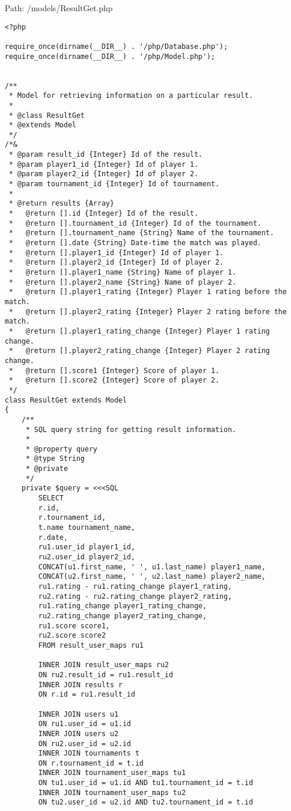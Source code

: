Path: /models/ResultGet.php
{\scriptsize
\begin{lstlisting}
<?php

require_once(dirname(__DIR__) . '/php/Database.php');
require_once(dirname(__DIR__) . '/php/Model.php');


/**
 * Model for retrieving information on a particular result.
 *
 * @class ResultGet
 * @extends Model
 */
/*&
 * @param result_id {Integer} Id of the result.
 * @param player1_id {Integer} Id of player 1.
 * @param player2_id {Integer} Id of player 2.
 * @param tournament_id {Integer} Id of tournament.
 *
 * @return results {Array}
 *   @return [].id {Integer} Id of the result.
 *   @return [].tournament_id {Integer} Id of the tournament.
 *   @return [].tournament_name {String} Name of the tournament.
 *   @return [].date {String} Date-time the match was played.
 *   @return [].player1_id {Integer} Id of player 1.
 *   @return [].player2_id {Integer} Id of player 2.
 *   @return [].player1_name {String} Name of player 1.
 *   @return [].player2_name {String} Name of player 2.
 *   @return [].player1_rating {Integer} Player 1 rating before the match.
 *   @return [].player2_rating {Integer} Player 2 rating before the match.
 *   @return [].player1_rating_change {Integer} Player 1 rating change.
 *   @return [].player2_rating_change {Integer} Player 2 rating change.
 *   @return [].score1 {Integer} Score of player 1.
 *   @return [].score2 {Integer} Score of player 2.
 */
class ResultGet extends Model
{
	/**
	 * SQL query string for getting result information.
	 *
	 * @property query
	 * @type String
	 * @private
	 */
	private $query = <<<SQL
		SELECT
		r.id,
		r.tournament_id,
		t.name tournament_name,
		r.date,
		ru1.user_id player1_id,
		ru2.user_id player2_id,
		CONCAT(u1.first_name, ' ', u1.last_name) player1_name,
		CONCAT(u2.first_name, ' ', u2.last_name) player2_name,
		ru1.rating - ru1.rating_change player1_rating,
		ru2.rating - ru2.rating_change player2_rating,
		ru1.rating_change player1_rating_change,
		ru2.rating_change player2_rating_change,
		ru1.score score1,
		ru2.score score2
		FROM result_user_maps ru1

		INNER JOIN result_user_maps ru2
		ON ru2.result_id = ru1.result_id
		INNER JOIN results r
		ON r.id = ru1.result_id
		
		INNER JOIN users u1
		ON ru1.user_id = u1.id
		INNER JOIN users u2
		ON ru2.user_id = u2.id
		INNER JOIN tournaments t
		ON r.tournament_id = t.id
		INNER JOIN tournament_user_maps tu1
		ON tu1.user_id = u1.id AND tu1.tournament_id = t.id
		INNER JOIN tournament_user_maps tu2
		ON tu2.user_id = u2.id AND tu2.tournament_id = t.id


\end{lstlisting}}
